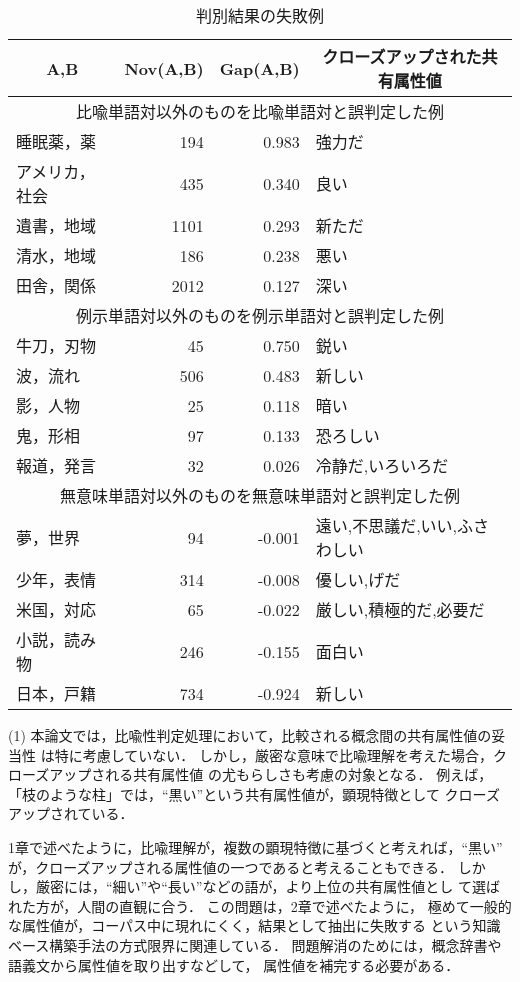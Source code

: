 \begin{table}[tb]
\begin{center}
\caption{判別結果の失敗例} 
\label{tbl:false}
\begin{tabular}{|l|r|r|l|}
\hline
\multicolumn{1}{|c|}{A,B}&Nov(A,B)&Gap(A,B)&\multicolumn{1}{|c|}{クローズアップされた共有属性値}\\
\hline
\multicolumn{4}{|c|}{比喩単語対以外のものを比喩単語対と誤判定した例}\\
\hline
睡眠薬，薬     &194    &0.983  &強力だ\\
アメリカ，社会 &435    &0.340  &良い\\
遺書，地域 	&1101	&0.293	&新ただ\\
清水，地域 	&186	&0.238	&悪い\\
田舎，関係 	&2012	&0.127	&深い\\
\hline
\multicolumn{4}{|c|}{例示単語対以外のものを例示単語対と誤判定した例}\\
\hline
牛刀，刃物     &45     &0.750  &鋭い\\
波，流れ       &506    &0.483  &新しい\\
影，人物       &25	&0.118 &暗い\\
鬼，形相       &97     &0.133  &恐ろしい\\
報道，発言     &32     &0.026  &冷静だ,いろいろだ\\
\hline
\multicolumn{4}{|c|}{無意味単語対以外のものを無意味単語対と誤判定した例}\\
\hline
夢，世界       &94     &-0.001 &遠い,不思議だ,いい,ふさわしい\\
少年，表情     &314    &-0.008 &優しい,げだ\\
米国，対応     &65	&-0.022 &厳しい,積極的だ,必要だ\\
小説，読み物   &246    &-0.155 &面白い\\
日本，戸籍     &734	&-0.924 &新しい\\
\hline
\end{tabular}
\end{center}
\end{table}

(1)
本論文では，比喩性判定処理において，比較される概念間の共有属性値の妥当性
は特に考慮していない．
しかし，厳密な意味で比喩理解を考えた場合，クローズアップされる共有属性値
の尤もらしさも考慮の対象となる．
例えば，「枝のような柱」では，``黒い''という共有属性値が，顕現特徴として
クローズアップされている．

1章で述べたように，比喩理解が，複数の顕現特徴に基づくと考えれば，``黒い''
が，クローズアップされる属性値の一つであると考えることもできる．
しかし，厳密には，``細い''や``長い''などの語が，より上位の共有属性値とし
て選ばれた方が，人間の直観に合う．
この問題は，2章で述べたように，
極めて一般的な属性値が，コーパス中に現れにくく，結果として抽出に失敗する
という知識ベース構築手法の方式限界に関連している．
問題解消のためには，概念辞書や語義文から属性値を取り出すなどして，
属性値を補完する必要がある．

